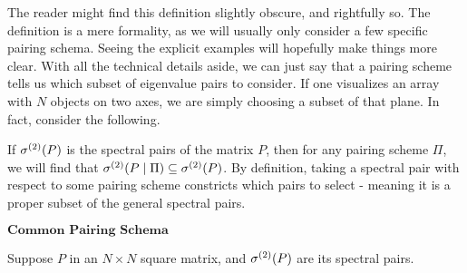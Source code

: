 The reader might find this definition slightly obscure, and rightfully so. The definition is a mere formality, as we will usually only consider a few specific pairing schema. Seeing the explicit examples will hopefully make things more clear. With all the technical details aside, we can just say that a pairing scheme tells us which subset of eigenvalue pairs to consider. If one visualizes an array with $N$ objects on two axes, we are simply choosing a subset of that plane. In fact, consider the following.

\begin{remark} If ${\sigma^{(2)}}(P)$ is the spectral pairs of the matrix $P$, then for any pairing scheme $\Pi$, we will find that ${\sigma^{(2)}}(P \mid \Pi) \subseteq {\sigma^{(2)}}(P)$. By definition, taking a spectral pair with respect to some pairing scheme constricts which pairs to select - meaning it is a proper subset of the general spectral pairs.
\end{remark}


\newpage

\begin{center}
$\textbf{Common Pairing Schema}$
\end{center}

Suppose $P$ in an $N \times N$ square matrix, and ${\sigma^{(2)}}(P)$ are its spectral pairs.

